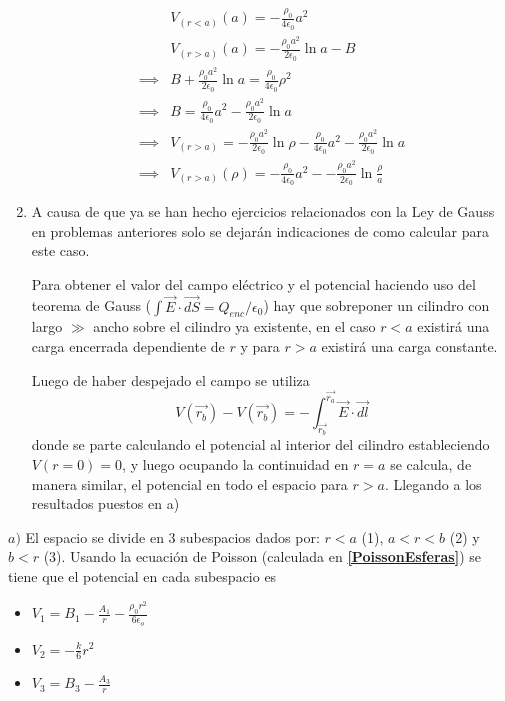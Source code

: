 \begin{enumerate}[label=\alph*)]
\begin{equation}
        \begin{split}
            &V_{(r<a)}(a) = -\frac{\rho_0}{4\epsilon_0}a^2\\
            &V_{(r>a)}(a) = -\frac{\rho_0a^2}{2\epsilon_0}\ln{a} - B\\
            \implies &B + \frac{\rho_0a^2}{2\epsilon_0}\ln{a} = \frac{\rho_0}{4\epsilon_0}\rho^2\\
            \implies &B = \frac{\rho_0}{4\epsilon_0}a^2 - \frac{\rho_0a^2}{2\epsilon_0}\ln{a}\\
            \implies &V_{(r>a)} = -\frac{\rho_0a^2}{2\epsilon_0}\ln{\rho} -\frac{\rho_0}{4\epsilon_0}a^2 - \frac{\rho_0a^2}{2\epsilon_0}\ln{a}\\
            \implies &V_{(r>a)}(\rho) = -\frac{\rho_0}{4\epsilon_0}a^2 - -\frac{\rho_0a^2}{2\epsilon_0}\ln{\frac{\rho}{a}}
        \end{split}
        \nonumber
    \end{equation}
    
    
    \item A causa de que ya se han hecho ejercicios relacionados con la Ley de Gauss en problemas anteriores solo se dejarán indicaciones de como calcular para este caso. 
    
    Para obtener el valor del campo eléctrico y el potencial haciendo uso del teorema de Gauss ($\int\vec{E}\cdot\vec{dS} = Q_{enc}/\epsilon_0$) hay que sobreponer un cilindro con largo $\gg$ ancho sobre el cilindro ya existente, en el caso $r<a$ existirá una carga encerrada dependiente de $r$ y para $r>a$ existirá una carga constante. 
    
    Luego de haber despejado el campo se utiliza \[V(\vec{r_b}) - V(\vec{r_b}) = -\int_{\vec{r_b}}^{\vec{r_a}}\vec{E}\cdot\vec{dl} \] donde se parte calculando el potencial al interior del cilindro estableciendo $V(r=0) = 0$, y luego ocupando la continuidad en $r=a$ se calcula, de manera similar, el potencial en todo el espacio para $r>a$. Llegando a los resultados puestos en a)
\end{enumerate}
\bigbreak
\bigbreak
{}\newline %

$a)$ El espacio se divide en 3 subespacios dados por: $r<a$ (1), $a<r<b$ (2) y $b<r$ (3). Usando la ecuación de Poisson (calculada en \textbf{\ref{PoissonEsferas}}) se tiene que el potencial en cada subespacio es

\begin{itemize}
    \item $V_1 = B_1-\frac{A_1}{r}-\frac{\rho_0 r^2}{6\epsilon_o}$
    \item $V_2 = -\frac{k}{6}r^2$
    \item $V_3 = B_3-\frac{A_3}{r}$
\end{itemize}

